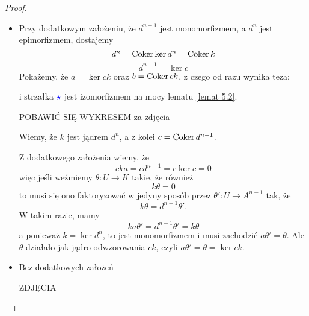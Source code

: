 \begin{proof}
  \begin{itemize}
    \item Przy dodatkowym założeniu, że $d^{n-1}$ jest monomorfizmem, a $d^n$ jest epimorfizmem, dostajemy
  $$d^n=\operatorname{Coker}\ker d^n=\operatorname{Coker} k$$
  $$d^{n-1}=\ker c$$
  Pokażemy, że $a=\ker ck$ oraz $b=\operatorname{Coker} ck$, z czego od razu wynika teza:
  \begin{center}\end{center}
  i strzałka $\color{blue}\star$ jest izomorfizmem na mocy lematu \ref{lemat 5.2}.

  {\large\color{red}POBAWIĆ SIĘ WYKRESEM za zdjęcia}

  \begin{center}\end{center} 

  Wiemy, że $k$ jest jądrem $d^n$, a z kolei $c=\operatorname{Coker} d^{n-1}$. 

  Z dodatkowego założenia wiemy, że
  $$cka=cd^{n-1}=c\ker c=0$$
  więc jeśli weźmiemy $\theta:U\to K$ takie, że również
  $$k\theta=0$$
  to musi się ono faktoryzować w jedyny sposób przez $\theta':U\to A^{n-1}$ tak, że
  $$k\theta= d^{n-1}\theta'.$$
  W takim razie, mamy
  $$ka\theta'=d^{n-1}\theta'=k\theta$$
  a ponieważ $k=\ker d^n$, to jest monomorfizmem i musi zachodzić $a\theta'=\theta$.
  Ale $\theta$ działało jak jądro odwzorowania $ck$, czyli $a\theta'=\theta=\ker ck$.

  \item Bez dodatkowych założeń

    {\large\color{red}ZDJĘCIA}
\end{itemize}

\end{proof}

